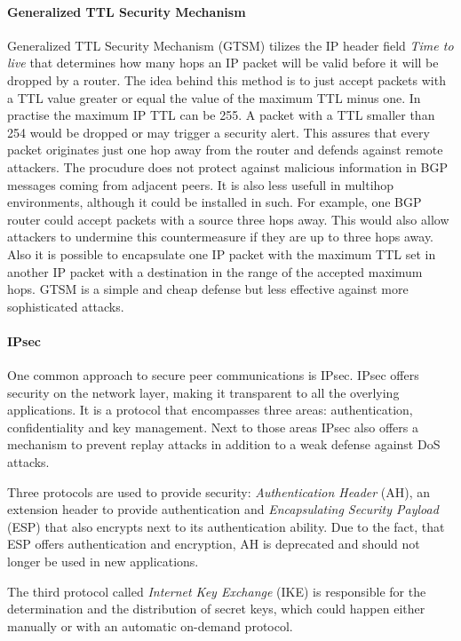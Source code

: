 \documentclass[12pt,a4paper]{IEEEtran}
\begin{document}
		\paragraph{Generalized TTL Security Mechanism}
		Generalized TTL Security Mechanism (GTSM) tilizes the IP header field \emph{Time to live} that determines how many hops an IP packet will be valid before it will be dropped by a router. The idea behind this method is to just accept packets with a TTL value greater or equal the value of the maximum TTL minus one. In practise the maximum IP TTL can be 255. A packet with a TTL smaller than 254 would be dropped or may trigger a security alert. This assures that every packet originates just one hop away from the router and defends against remote attackers. The procudure does not protect against malicious information in BGP messages coming from adjacent peers. It is also less usefull in multihop environments, although it could be installed in such. For example, one BGP router could accept packets with a source three hops away. This would also allow attackers to undermine this countermeasure if they are up to three hops away. Also it is possible to encapsulate one IP packet with the maximum TTL set in another IP packet with a destination in the range of the accepted maximum hops. GTSM is a simple and cheap defense but less effective against more sophisticated attacks. 
	
		\paragraph{IPsec}	
		One common approach to secure peer communications is IPsec. IPsec offers security on the network layer, making it transparent to all the overlying applications. It is a protocol that encompasses three areas: authentication, confidentiality and key management. Next to those areas IPsec also offers a mechanism to prevent replay attacks in addition to a weak defense against DoS attacks.

		Three protocols are used to provide security: \emph{Authentication Header} (AH), an extension header to provide authentication and \emph{Encapsulating Security Payload} (ESP) that also encrypts next to its authentication ability. Due to the fact, that ESP offers authentication and encryption, AH is deprecated and should not longer be used in new applications. 
		
		The third protocol called \emph{Internet Key Exchange} (IKE) is responsible for the determination and the distribution of secret keys, which could happen either manually or with an automatic on-demand protocol.
\end{document}
